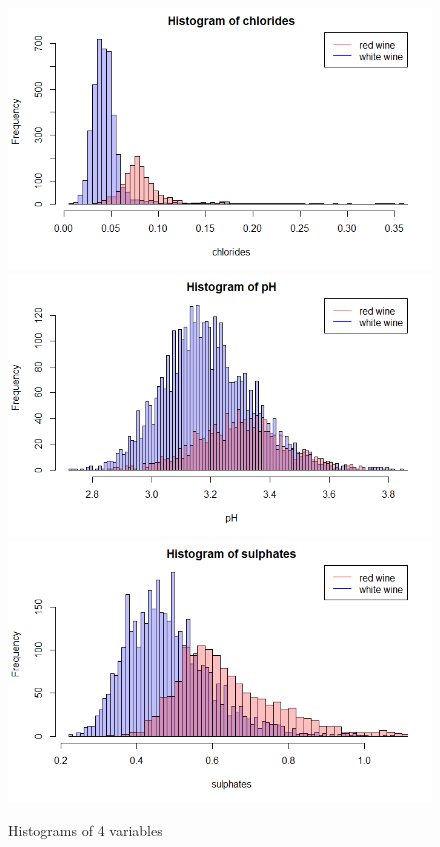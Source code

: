 \documentclass[10pt]{article}
\begin{document}
\begin{figure}[H]
\centering
\caption{Histograms of 4 variables}
\includegraphics[scale=0.35]{histogram_of_chlorides}
\includegraphics[scale=0.35]{histogram_of_pH}
\includegraphics[scale=0.35]{histogram_of_sulphates}

\end{figure}
\end{document}
